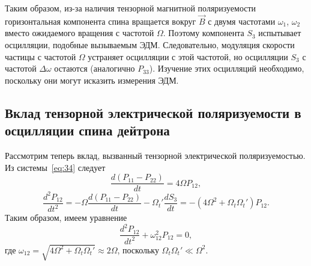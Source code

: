 \documentclass[11pt,a4paper]{article}
\begin{document}
Таким образом, из-за наличия тензорной магнитной поляризуемости
горизонтальная компонента спина вращается вокруг $\vec{B}$ с двумя
частотами $\omega_1$, $\omega_2$ вместо ожидаемого вращения с частотой
$\Omega$. Поэтому компонента $S_3$ испытывает осцилляции, подобные
вызываемым ЭДМ. Следовательно, модуляция скорости частицы с частотой
$\Omega$ устраняет осцилляции с этой частотой, но осцилляции $S_3$
с частотой $\Delta\omega$ остаются (аналогично $P_{33}$). Изучение
этих осцилляций необходимо, поскольку они могут исказить измерения ЭДМ.

\subsection{Вклад тензорной электрической поляризуемости в осцилляции
спина дейтрона}

Рассмотрим теперь вклад, вызванный тензорной электрической поляризуемостью.
Из системы~\eqref{eq:34} следует
\begin{equation}
\frac{d(P_{11}-P_{22})}{dt}=4\Omega P_{12},
\label{eq:58}
\end{equation}
\begin{equation}
\frac{d^2 P_{12}}{dt^2}
=-\Omega\frac{d(P_{11}-P_{22})}{dt}-\Omega_t'\frac{dS_3}{dt}
=-(4\Omega^2+\Omega_t\Omega_t')P_{12}.
\label{eq:58b}
\end{equation}
Таким образом, имеем уравнение
\begin{equation}
\frac{d^2 P_{12}}{dt^2}+\omega_{12}^2 P_{12}=0,
\label{eq:59}
\end{equation}
где $\omega_{12}=\sqrt{4\Omega^2+\Omega_t\Omega_t'}\approx 2\Omega$,
поскольку $\Omega_t\Omega_t'\ll\Omega^2$.
\end{document}
